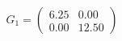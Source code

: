 \documentclass[preview]{standalone}
\begin{document}
\begin{align*}
G_1 = \begin{pmatrix} 6.25 & 0.00 \\ 0.00 & 12.50 \end{pmatrix}
\end{align*}
\end{document}
